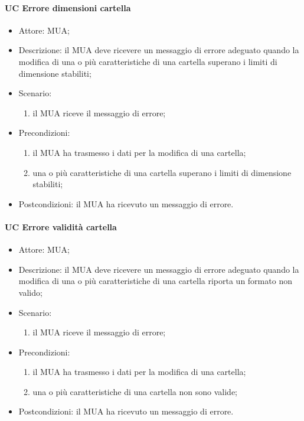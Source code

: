     \paragraph{UC Errore dimensioni cartella} \label{sec: UC 11.4.2.1}
    \begin{itemize}
        \item Attore: MUA;
        \item Descrizione: il MUA deve ricevere un messaggio di errore adeguato quando la modifica di una o più caratteristiche di una cartella superano i limiti di dimensione stabiliti;
        \item Scenario:
        \begin{enumerate}
        \item il MUA riceve il messaggio di errore;
        \end{enumerate}   
        \item Precondizioni: 
        \begin{enumerate}
            \item il MUA ha trasmesso i dati per la modifica di una cartella;
            \item una o più caratteristiche di una cartella superano i limiti di dimensione stabiliti;
        \end{enumerate}
        \item Postcondizioni: il MUA ha ricevuto un messaggio di errore.
    \end{itemize}

    \paragraph{UC Errore validità cartella} \label{sec: UC 11.4.2.1}
    \begin{itemize}
        \item Attore: MUA;
        \item Descrizione: il MUA deve ricevere un messaggio di errore adeguato quando la modifica di una o più caratteristiche di una cartella riporta un formato non valido;
        \item Scenario:
        \begin{enumerate}
        \item il MUA riceve il messaggio di errore;
        \end{enumerate}   
        \item Precondizioni: 
        \begin{enumerate}
            \item il MUA ha trasmesso i dati per la modifica di una cartella;
            \item una o più caratteristiche di una cartella  non sono valide;
        \end{enumerate}
        \item Postcondizioni: il MUA ha ricevuto un messaggio di errore.
    \end{itemize}


